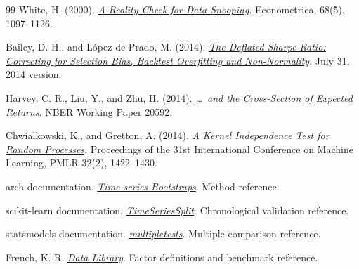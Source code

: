 \documentclass[11pt,letterpaper]{article}
\begin{document}
\begin{thebibliography}{99}
White, H. (2000).
\href{https://www.ssc.wisc.edu/~bhansen/718/White2000.pdf}
{\emph{A Reality Check for Data Snooping}}.
Econometrica, 68(5), 1097--1126.

Bailey, D. H., and L\'opez de Prado, M. (2014).
\href{https://www.davidhbailey.com/dhbpapers/deflated-sharpe.pdf}
{\emph{The Deflated Sharpe Ratio: Correcting for Selection Bias,
Backtest Overfitting and Non-Normality}}. July 31, 2014 version.

Harvey, C. R., Liu, Y., and Zhu, H. (2014).
\href{https://www.nber.org/papers/w20592}
{\emph{\ldots\ and the Cross-Section of Expected Returns}}.
NBER Working Paper 20592.

Chwialkowski, K., and Gretton, A. (2014).
\href{https://proceedings.mlr.press/v32/chwialkowski14.html}
{\emph{A Kernel Independence Test for Random Processes}}.
Proceedings of the 31st International Conference on Machine Learning,
PMLR 32(2), 1422--1430.

arch documentation.
\href{https://arch.readthedocs.io/en/stable/bootstrap/timeseries-bootstraps.html}
{\emph{Time-series Bootstraps}}. Method reference.

scikit-learn documentation.
\href{https://scikit-learn.org/stable/modules/generated/sklearn.model_selection.TimeSeriesSplit.html}
{\emph{TimeSeriesSplit}}. Chronological validation reference.

statsmodels documentation.
\href{https://www.statsmodels.org/stable/generated/statsmodels.stats.multitest.multipletests.html}
{\emph{multipletests}}. Multiple-comparison reference.

French, K. R.
\href{https://mba.tuck.dartmouth.edu/pages/faculty/ken.french/data_library.html}
{\emph{Data Library}}. Factor definitions and benchmark reference.
\end{thebibliography}

%
\end{document}

